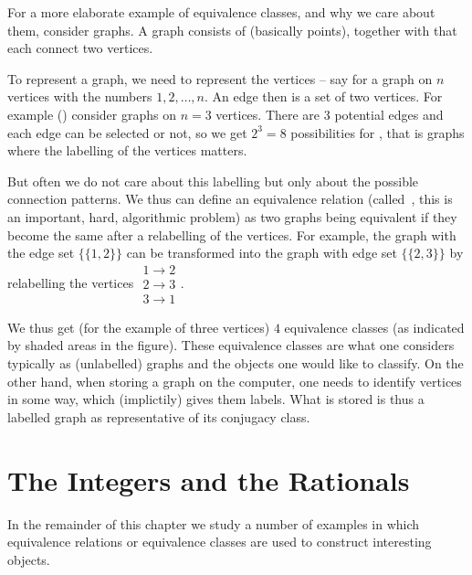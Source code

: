 For a more elaborate example of equivalence classes, and why we care about
them, consider graphs. A graph consists of  (basically
points), together with  that each connect two vertices.

To represent a graph, we need to represent the vertices -- say for a graph
on $n$ vertices with the numbers $1,2,\ldots,n$. An edge then is a set of
two vertices. For example () consider graphs on $n=3$
vertices. There are 3 potential edges and each edge can be selected or not,
so we get $2^3=8$ possibilities for , that is graphs
where the labelling of the vertices matters.

But often we do not care about this labelling but only  about the possible
connection patterns. We thus can define an equivalence relation
(called~, this is an important, hard, algorithmic
problem) 
as two graphs being equivalent if they become the same after a
relabelling of the vertices. For example, the graph with the edge set
$\{\{1,2\}\}$ can be transformed into the graph with edge set $\{\{2,3\}\}$ by
relabelling
the vertices $\begin{array}{c}1\to 2\\2\to3\\3\to1\end{array}$.

We thus get (for the example of three vertices) $4$ equivalence classes
(as indicated by shaded areas in the figure). These equivalence classes are
what one considers typically as (unlabelled) graphs and the objects one would
like to classify. On the other hand, when storing a graph on the computer,
one needs to identify vertices in some way, which (implictily) gives them
labels. What is stored is thus a labelled graph as representative of its
conjugacy class.

\section{The Integers and the Rationals}

In the remainder of this chapter we study a number of examples in which
equivalence relations or equivalence classes are used to construct
interesting objects.
\smallskip


